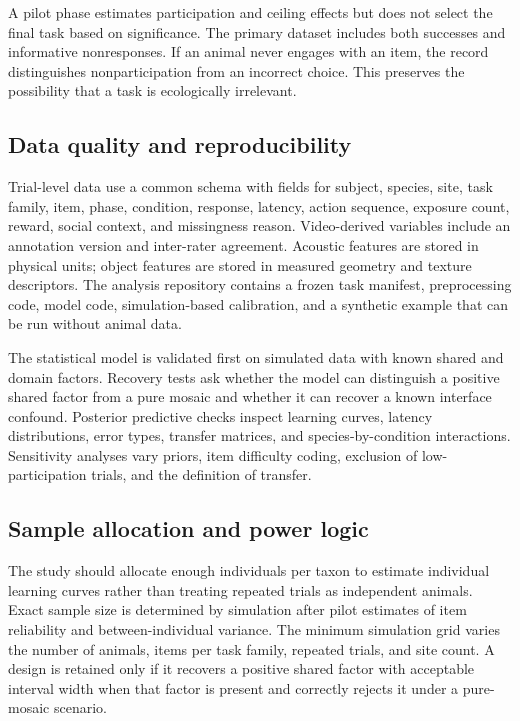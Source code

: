 \documentclass[conference]{IEEEtran}
\begin{document}
A pilot phase estimates participation and ceiling effects but does not select the final task based on significance. The primary dataset includes both successes and informative nonresponses. If an animal never engages with an item, the record distinguishes nonparticipation from an incorrect choice. This preserves the possibility that a task is ecologically irrelevant.

\subsection{Data quality and reproducibility}
Trial-level data use a common schema with fields for subject, species, site, task family, item, phase, condition, response, latency, action sequence, exposure count, reward, social context, and missingness reason. Video-derived variables include an annotation version and inter-rater agreement. Acoustic features are stored in physical units; object features are stored in measured geometry and texture descriptors. The analysis repository contains a frozen task manifest, preprocessing code, model code, simulation-based calibration, and a synthetic example that can be run without animal data.

The statistical model is validated first on simulated data with known shared and domain factors. Recovery tests ask whether the model can distinguish a positive shared factor from a pure mosaic and whether it can recover a known interface confound. Posterior predictive checks inspect learning curves, latency distributions, error types, transfer matrices, and species-by-condition interactions. Sensitivity analyses vary priors, item difficulty coding, exclusion of low-participation trials, and the definition of transfer.

\subsection{Sample allocation and power logic}
The study should allocate enough individuals per taxon to estimate individual learning curves rather than treating repeated trials as independent animals. Exact sample size is determined by simulation after pilot estimates of item reliability and between-individual variance. The minimum simulation grid varies the number of animals, items per task family, repeated trials, and site count. A design is retained only if it recovers a positive shared factor with acceptable interval width when that factor is present and correctly rejects it under a pure-mosaic scenario.
\end{document}
